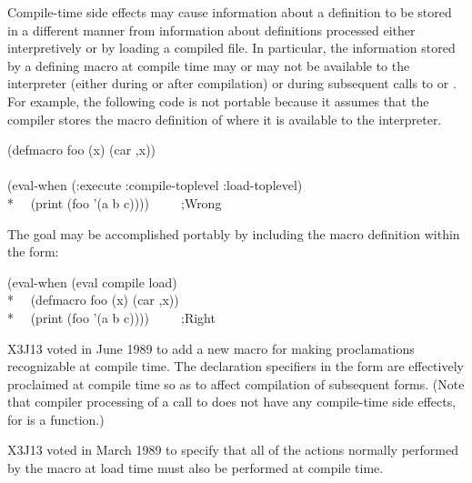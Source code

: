 Compile-time side effects may cause information about a
    definition to be stored in a different manner from
information about definitions
    processed either interpretively or by loading
    a compiled file.
    In particular, the information stored by a defining macro at
    compile time may or may not be available to the interpreter (either
    during or after compilation) or during subsequent calls to  or
    .  For example, the following code is not portable because
    it assumes that the compiler stores the macro definition of  where
    it is available to the interpreter.
\begin{lisp}
(defmacro foo (x) {\Xbq}(car ,x)) \\
\\
(eval-when (:execute :compile-toplevel :load-toplevel) \\*
~~(print (foo '(a b c))))~~~~~;\textrm{Wrong}
\end{lisp}
    The goal may be accomplished portably by including the macro
    definition within the  form:
\begin{lisp}  
(eval-when (eval compile load) \\*
~~(defmacro foo (x) {\Xbq}(car ,x)) \\*
~~(print (foo '(a b c))))~~~~~;\textrm{Right}
\end{lisp}

\begin{flushdesc}
\item[\cdf{declaim}]

X3J13 voted in June 1989 
to add a new macro  for making proclamations recognizable
at compile time.  The declaration specifiers in the  form
are effectively proclaimed at compile time so as to affect
compilation of subsequent forms.  (Note that compiler processing
of a call to 
does not have any compile-time side effects, for 
is a function.)
\end{flushdesc}

\begin{flushdesc}
\item[\cdf{in-package}]

X3J13 voted in March 1989  to specify that
all of the actions normally performed by the  macro at load
time must also be performed at compile time.
\end{flushdesc}


